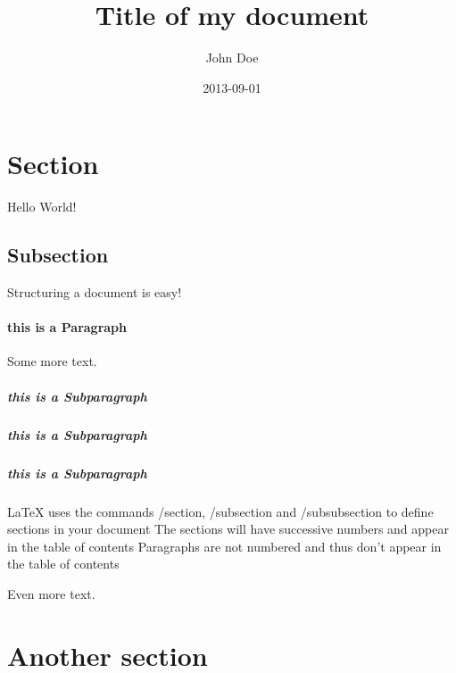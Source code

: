 \documentclass{article}
\title{Title of my document}
\date{2013-09-01}
\author{John Doe}
\begin{document}
\maketitle
{}
\newpage
{}

\section{Section}

Hello World!

\subsection{Subsection}

Structuring a document is easy!

\paragraph{this is a Paragraph}

Some more text.

\subparagraph{this is a Subparagraph}
\subparagraph{this is a Subparagraph}
\subparagraph{this is a Subparagraph}
LaTeX uses the commands \slash section, \slash subsection and \slash subsubsection to define sections in your document
The sections will have successive numbers and appear in the table of contents
Paragraphs are not numbered and thus don't appear in the table of contents

Even more text.

\section{Another section}
\end{document}

